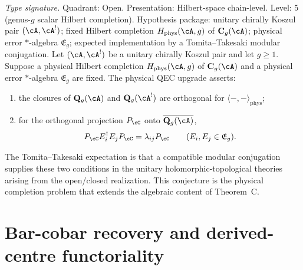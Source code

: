 \begin{conjecture}
\label{conj:hc-physical-qec}
\textit{Type signature.} Quadrant: Open. Presentation: Hilbert-space
chain-level. Level: $5$ (genus-$g$ scalar Hilbert completion).
Hypothesis package: unitary chirally Koszul pair $(\cA,\cA^!)$;
fixed Hilbert completion $H_{\mathrm{phys}}(\cA,g)$ of $\mathbf
C_g(\cA)$; physical error $*$-algebra $\mathfrak E_g$; expected
implementation by a Tomita--Takesaki modular conjugation.
\smallskip\noindent
Let $(\cA,\cA^!)$ be a unitary chirally Koszul pair and let
$g\geq1$.  Suppose a physical Hilbert completion
$H_{\mathrm{phys}}(\cA,g)$ of $\mathbf C_g(\cA)$ and a physical
error $*$-algebra $\mathfrak E_g$ are fixed.  The physical QEC
upgrade asserts:
\begin{enumerate}[label=\textup{(\roman*)}]
\item the closures of $\mathbf Q_g(\cA)$ and
 $\mathbf Q_g(\cA^!)$ are orthogonal for
 $\langle-,-\rangle_{\mathrm{phys}}$;
\item for the orthogonal projection $P_\cC$ onto
 $\overline{\mathbf Q_g(\cA)}$,
 \[
 P_\cC E_i^\dagger E_j P_\cC
 =\lambda_{ij}P_\cC
 \qquad(E_i,E_j\in\mathfrak E_g).
 \]
\end{enumerate}
The Tomita--Takesaki expectation is that a compatible modular
conjugation supplies these two conditions in the unitary
holomorphic-topological theories arising from the open/closed
realization.  This conjecture is the physical completion problem that
extends the algebraic content of Theorem~C.
\end{conjecture}

%
%

\section{Bar-cobar recovery and derived-centre functoriality}
\label{sec:hc-koszulness-exact-qec}

